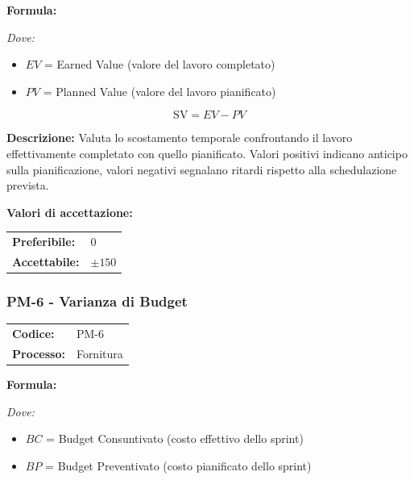 \documentclass[a4paper,11pt,oneside]{scrartcl}
\begin{document}
\vspace{0.3cm}
\noindent\textbf{Formula:}

\noindent\textit{Dove:}
\begin{itemize}[leftmargin=1.5cm, topsep=0pt, itemsep=0pt]
    \item $EV$ = Earned Value (valore del lavoro completato)
    \item $PV$ = Planned Value (valore del lavoro pianificato)
\end{itemize}

\[
    \text{SV} = EV - PV
\]

\noindent\textbf{Descrizione:} Valuta lo scostamento temporale confrontando il lavoro effettivamente completato con quello pianificato. Valori positivi indicano anticipo sulla pianificazione, valori negativi segnalano ritardi rispetto alla schedulazione prevista.

\vspace{0.2cm}
\noindent\textbf{Valori di accettazione:}
\vspace{0.1cm}

\noindent
\begin{tabular}{@{}ll@{}}
    \textbf{Preferibile:} & $0$       \\
    \textbf{Accettabile:} & $\pm 150$ \\
\end{tabular}

\subsubsection{PM-6 - Varianza di Budget}

\noindent
\begin{tabular}{@{}p{}p{}@{}}
    \textbf{Codice:}   & PM-6      \\
    \textbf{Processo:} & Fornitura \\
\end{tabular}

\vspace{0.3cm}
\noindent\textbf{Formula:}

\noindent\textit{Dove:}
\begin{itemize}[leftmargin=1.5cm, topsep=0pt, itemsep=0pt]
    \item $BC$ = Budget Consuntivato (costo effettivo dello sprint)
    \item $BP$ = Budget Preventivato (costo pianificato dello sprint)
\end{itemize}
\end{document}
